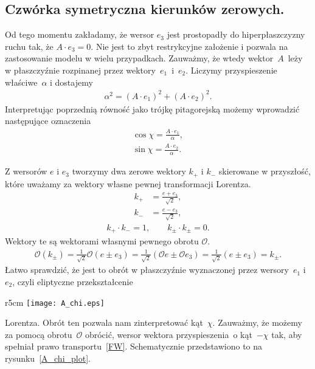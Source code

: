 \subsection{Czwórka symetryczna kierunków zerowych.}
Od tego momentu zakładamy, że wersor $e_3$ jest prostopadły do 
hiperpłaszczyzny ruchu tak, że
$A\cdot e_3 = 0$.
Nie jest to zbyt restrykcyjne założenie i pozwala 
na zastosowanie modelu w wielu przypadkach.
Zauważmy, że wtedy wektor~$A$~leży w płaszczyźnie rozpinanej przez 
wektory~$e_1$~i~$e_2$. Liczymy przyspieszenie właściwe~$\alpha$ i 
dostajemy
\begin{align*}
\alpha^2 = (A\cdot e_1)^2 + (A\cdot e_2)^2.
\end{align*}
Interpretując poprzednią równość jako trójkę pitagorejską 
możemy wprowadzić następujące oznaczenia
\begin{align*}
\cos\chi = \frac{A\cdot e_1}{\alpha},\\
\sin\chi = \frac{A\cdot e_2}{\alpha}.
\end{align*}

Z wersorów $e$ i $e_3$ tworzymy dwa zerowe wektory $k_+$ i $k_-$
skierowane w przyszłość, 
które uważamy za wektory własne pewnej transformacji Lorentza. 
\begin{align}
k_+ &= \frac{e+e_3}{\sqrt{2}} ,\\
k_- &= \frac{e-e_3}{\sqrt{2}} ,
\end{align}
\begin{align*}
k_+\cdot k_- = 1, \qquad k_\pm\cdot k_\pm  = 0.
\end{align*}
Wektory te są wektorami własnymi pewnego obrotu $\mathcal{O}$.
\begin{align*}
\mathcal{O}( k_\pm ) = \frac{1}{\sqrt{2}} \mathcal{O} 
(e\pm e_3) =\frac{1}{\sqrt{2}} 
(\mathcal{O} e\pm \mathcal{O} e_3) =
\frac{1}{\sqrt{2}}  (e\pm e_3) = k_\pm.
\end{align*}
 Łatwo sprawdzić, że 
jest 
to obrót w płaszczyźnie wyznaczonej przez wersory~$e_1$ i $e_2$,
czyli eliptyczne przekształcenie \begin{wrapfigure}[15]{r}{5cm}
\centering
\texttt{[image: A\_chi.eps]}
\caption{Schemat obrazujący obrót~$\mathcal{O}$ wykonany na wersorze 
przyspieszenia $A/\alpha$ w bazie $E$.}{\label{A_chi_plot}}
\end{wrapfigure}Lorentza. 
Obrót ten pozwala nam zinterpretować kąt~$\chi$. 
Zauważmy, że możemy za pomocą obrotu~$\mathcal{O}$ obrócić, 
wersor wektora przyspieszenia~o kąt~$-\chi$ 
tak, aby spełniał prawo transportu~\eqref{FW}. 
Schematycznie przedstawiono to na rysunku~\ref{A_chi_plot}.

